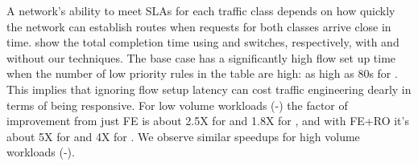 
A network's ability to meet SLAs for each traffic class depends on how
quickly the network can establish routes when requests for both classes
arrive close in time.
 show the total completion time using
\BroadcomOne and \Intel switches, respectively, with and without our
techniques. The base case has a significantly high flow set up time when the
number of low priority rules in the table are high: as high as 80s for
\BroadcomOne. This implies that ignoring flow setup latency can cost traffic
engineering dearly in terms of being responsive.  For low volume workloads
(\sA-\sC) the factor of improvement from just FE is about 2.5X for
\BroadcomOne and 1.8X for \Intel, and with FE+RO it's about 5X for
\BroadcomOne and 4X for \Intel. We observe similar speedups for high volume
workloads (\sD-\sF). 





